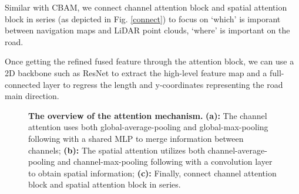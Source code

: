 \documentclass[letterpaper,10 pt,conference]{ieeeconf}  %
\begin{document}
Similar with CBAM\cite{CBAM}, we connect channel attention block and spatial attention block in series (as depicted in Fig. \ref{connect}) to focus on `which' is imporant between navigation maps and LiDAR point clouds, `where' is important on the road.

Once getting the refined fused feature through the attention block, we can use a 2D backbone such as ResNet\cite{37} to extract the high-level feature map and a full-connected layer to regress the length and y-coordinates representing the road main direction.

\begin{figure}
    \centering
    \setlength{\belowcaptionskip}{-0.6cm}
    \caption{\textbf{The overview of the attention mechanism.} \textbf{(a):} The channel attention uses both global-average-pooling and global-max-pooling following with a shared MLP to merge information between channels; \textbf{(b):} The spatial attention utilizes both channel-average-pooling and channel-max-pooling following with a convolution layer to obtain spatial information; \textbf{(c):} Finally, connect channel attention block and spatial attention block in series.}
\end{figure}
\end{document}
